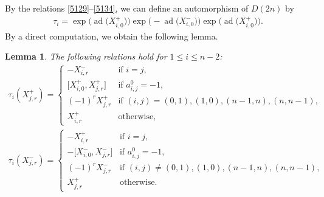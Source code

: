 \documentclass[pdftex]{sigma}
\numberwithin{equation}{section}
\newtheorem{Lemma}[Theorem]{Lemma}
\theoremstyle{definition}
\DeclareMathOperator{\ad}{ad}
\begin{document}
By the relations \eqref{5129}--\eqref{5134}, we can define an automorphism of $D(2n)$ by
\begin{gather*}
\tau_i=\exp\bigl(\ad\bigl(X^+_{i,0}\bigr)\bigr)\exp\bigl(-\ad\bigl(X^-_{i,0}\bigr)\bigr)\exp\bigl(\ad\bigl(X^+_{i,0}\bigr)\bigr).
\end{gather*}
By a direct computation, we obtain the following lemma.
\begin{Lemma}\label{Weyl}
The following relations hold for $1\leq i\leq n-2$:
\begin{gather*}
\tau_i(X^+_{j,r})=\begin{cases}
-X^-_{i,r}&\text{if }i=j,\\
\bigl[X^+_{i,0},X^+_{j,r}\bigr]&\text{if }a^0_{i,j}=-1,\\
(-1)^rX^+_{j,r}&\text{if }(i,j)=(0,1),(1,0),(n-1,n),(n,n-1),\\
X^+_{i,r}&\text{otherwise},
\end{cases}\\
\tau_i(X^-_{j,r})=\begin{cases}
-X^+_{i,r}&\text{if }i=j,\\
-\bigl[X^-_{i,0},X^-_{j,r}\bigr]&\text{if }a^0_{i,j}=-1,\\
(-1)^rX^-_{j,r}&\text{if }(i,j)\neq(0,1),(1,0),(n-1,n),(n,n-1),\\
X^+_{j,r}&\text{otherwise}.
\end{cases}
\end{gather*}
\end{Lemma}
\end{document}
